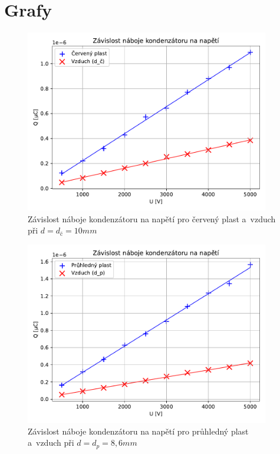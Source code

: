 \documentclass[a4paper,12pt]{article}
\begin{document}
\section{Grafy}
\begin{figure}[H]
    \centering
    \includegraphics[width=0.95\textwidth]{img/cerveny_plast.pdf}
    \caption{Závislost náboje kondenzátoru na napětí pro červený plast a~vzduch při $d=d_{č}=10mm$}
    \label{fig:cerveny_plast}
\end{figure}

\begin{figure}[H]
    \centering
    \includegraphics[width=0.95\textwidth]{img/pruhledny_plast.pdf}
    \caption{Závislost náboje kondenzátoru na napětí pro průhledný plast a~vzduch při $d=d_{p}=8,6mm$}
    \label{fig:pruhledny_plast}
\end{figure}
\end{document}
